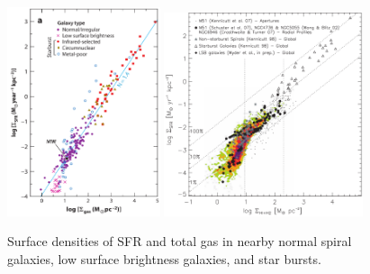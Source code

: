 \documentclass[legal,11pt]{article}
\begin{document}
\begin{figure}
\centering
\includegraphics[width=0.4\textwidth]{KSlaw.pdf}
\includegraphics[width=0.52\textwidth]{bigiel08.pdf}
\caption{Surface densities of SFR and total gas in nearby normal spiral
        galaxies, low surface brightness galaxies, and star
        bursts\citep[i.e.,][]{Bigiel2008}.  }
\label{bigiel08}
\end{figure}
\end{document}
